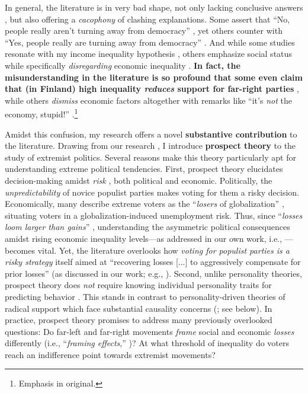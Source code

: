 \documentclass[letterpaper]{article}
\begin{document}
\vspace{2mm}In general, the literature is in very bad shape, not only lacking conclusive answers \parencite[p. 6]{Ivarsflaten2008}, but also offering a \emph{cacophony} of clashing explanations. Some assert that ``No, people really aren't turning away from democracy'' \parencite{Voeten2016}, yet others counter with ``Yes, people really are turning away from democracy'' \parencite{Mounk2016}. And while some studies resonate with my income inequality hypothesis \parencite{Han2016b}, others emphasize social status while specifically \emph{disregarding} economic inequality \parencite{Gidron2017a,Oesch2008a}. {\bf In fact, the misunderstanding in the literature is so profound that some even claim that (in Finland) high inequality \emph{reduces} support for far-right parties} \parencite[p. 725]{Patana2020b}, while others \emph{dismiss} economic factors altogether with remarks like ``it's \emph{not} the economy, stupid!'' \parencite{Mudde2007b}.\footnote{Emphasis in original.}

\vspace{2mm}Amidst this confusion, my research offers a novel {\bf substantive contribution} to the literature. Drawing from our research \parencite{Bahamonde2022b}, I introduce {\bf prospect theory} \parencite{Kahneman1979} to the study of extremist politics. Several reasons make this theory particularly apt for understanding extreme political tendencies. First, prospect theory elucidates decision-making amidst \emph{risk} \parencite{McDermott1998,Levy1992a}, both political and economic. Politically, the \emph{unpredictability} of novice populist parties \parencite{Ivarsflaten2008} makes voting for them a risky decision. Economically, many describe extreme voters as the ``\emph{losers} of globalization'' \parencite{Im2019,Milner2021b}, situating voters in a globalization-induced unemployment risk.  Thus, since ``\emph{losses loom larger than gains}'' \parencite{Kahneman1979}, understanding the asymmetric political consequences amidst rising economic inequality levels---as addressed in our own work, i.e., \cite{Bahamonde2021}---becomes vital. Yet, the literature overlooks how \emph{voting for populist parties is a risky strategy} itself aimed at ``recovering losses [...] to aggressively compensate for prior losses'' (as discussed in our work; e.g., \cite[p. 2]{Bahamonde2022b}). Second, unlike personality theories, prospect theory does \emph{not} require knowing individual personality traits for predicting behavior \parencite{McDermott2004,Vis2011}. This stands in contrast to personality-driven theories of radical support \parencite{Cohen2016} which face substantial causality concerns (\cite{Mudde2007b}; see below). In practice, prospect theory promises to address many previously overlooked questions: Do far-left and far-right movements \emph{frame} social and economic \emph{losses} differently (i.e., ``\emph{framing effects},'' \cite{Kahneman1979})? At what threshold of inequality do voters reach an indifference point towards extremist movements?
\end{document}
